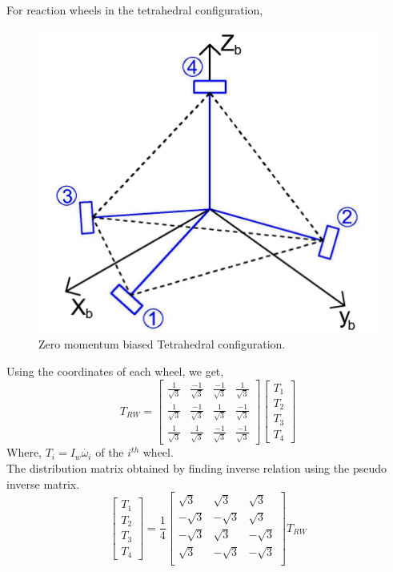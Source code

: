 \documentclass[10pt,a4paper]{report}
\begin{document}
For reaction wheels in the tetrahedral configuration, 
\begin{figure}[H]
\centering
\includegraphics[scale=0.5]{Tetconfig.png}
\caption{Zero momentum biased Tetrahedral configuration.}
\end{figure}

Using the coordinates of each wheel, we get,
\begin{equation}
T_{RW}=\begin{bmatrix}
\frac{1}{\sqrt{3}} &\frac{-1}{\sqrt{3}}&\frac{-1}{\sqrt{3}}&\frac{1}{\sqrt{3}} \\
\frac{1}{\sqrt{3}} &\frac{-1}{\sqrt{3}}&\frac{1}{\sqrt{3}}&\frac{-1}{\sqrt{3}} \\
\frac{1}{\sqrt{3}} &\frac{1}{\sqrt{3}}&\frac{-1}{\sqrt{3}}&\frac{-1}{\sqrt{3}} 
\end{bmatrix}
\begin{bmatrix}
T_{1}\\T_{2}\\T_{3}\\T_{4}
\end{bmatrix}
\end{equation}
Where, $ T_{i}=I_{w}\dot{\omega_{i}} $ of the $ i^{th} $ wheel.
\\The distribution matrix obtained by finding inverse relation using the pseudo inverse matrix.
\begin{equation}
\begin{bmatrix}
T_{1}\\T_{2}\\T_{3}\\T_{4}
\end{bmatrix}
=\frac{1}{4}\begin{bmatrix}
\sqrt{3}&\sqrt{3}&\sqrt{3}\\
-\sqrt{3}&-\sqrt{3}&\sqrt{3}\\
-\sqrt{3}&\sqrt{3}&-\sqrt{3}\\
\sqrt{3}&-\sqrt{3}&-\sqrt{3}\\
\end{bmatrix}
T_{RW}
\end{equation}
\end{document}
